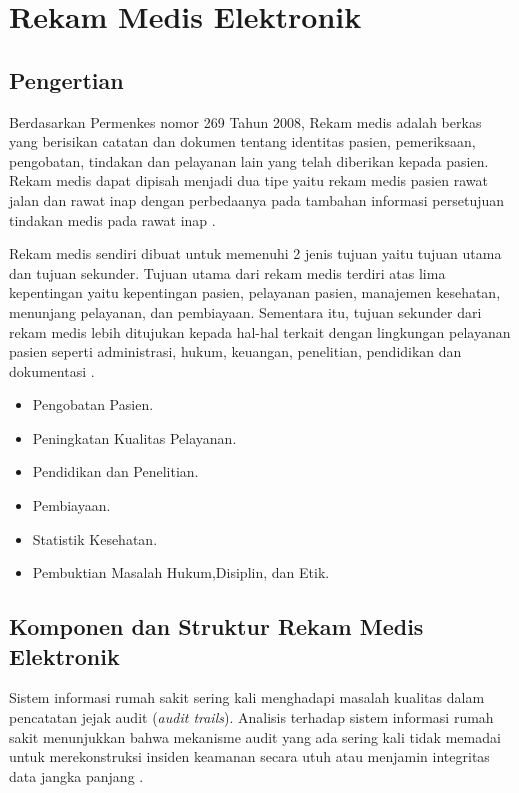 \section{Rekam Medis Elektronik}

\subsection{Pengertian}
Berdasarkan Permenkes nomor 269 Tahun 2008, Rekam medis adalah berkas yang berisikan catatan dan dokumen tentang identitas pasien, pemeriksaan, pengobatan, tindakan dan pelayanan lain yang telah diberikan kepada pasien. Rekam medis dapat dipisah menjadi dua tipe yaitu rekam medis pasien rawat jalan dan rawat inap dengan perbedaanya pada tambahan informasi persetujuan tindakan medis pada rawat inap \parencite{1}.

Rekam medis sendiri dibuat untuk memenuhi 2 jenis tujuan yaitu tujuan utama dan tujuan sekunder. Tujuan utama dari rekam medis terdiri atas lima kepentingan yaitu kepentingan pasien, pelayanan pasien, manajemen kesehatan, menunjang pelayanan, dan pembiayaan. Sementara itu, tujuan sekunder dari rekam medis lebih ditujukan kepada hal-hal terkait dengan lingkungan pelayanan pasien seperti administrasi, hukum, keuangan, penelitian, pendidikan dan dokumentasi \parencite{1}.

\begin{itemize}
    \item Pengobatan Pasien.
    \item Peningkatan Kualitas Pelayanan.
    \item Pendidikan dan Penelitian.
    \item Pembiayaan.
    \item Statistik Kesehatan.
    \item Pembuktian Masalah Hukum,Disiplin, dan Etik.
\end{itemize}

\subsection{Komponen dan Struktur Rekam Medis Elektronik}


Sistem informasi rumah sakit sering kali menghadapi masalah kualitas dalam pencatatan jejak audit (\textit{audit trails}). Analisis terhadap sistem informasi rumah sakit menunjukkan bahwa mekanisme audit yang ada sering kali tidak memadai untuk merekonstruksi insiden keamanan secara utuh atau menjamin integritas data jangka panjang \cite{6}.

